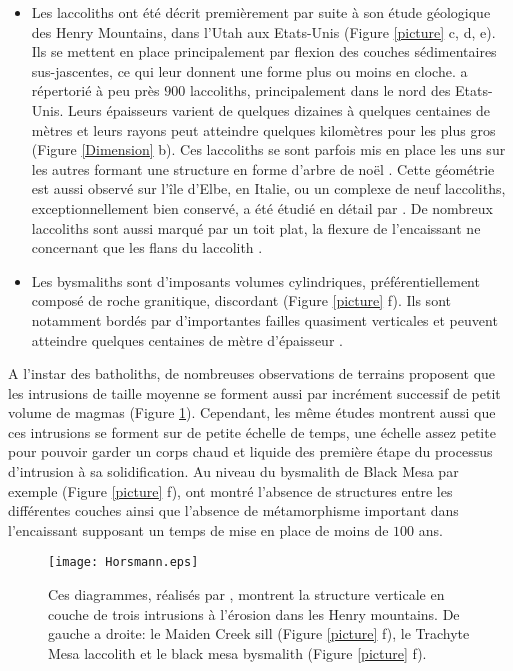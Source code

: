 \begin{itemize}
\item    Les   laccoliths    ont   été    décrit   premièrement    par
  \citet{Gilbert:1877uk}  suite  à  son  étude  géologique  des  Henry
  Mountains, dans  l'Utah aux  Etats-Unis (Figure \ref{picture}  c, d,
  e).  Ils se mettent en  place principalement par flexion des couches
  sédimentaires sus-jascentes, ce  qui leur donnent une  forme plus ou
  moins en  cloche.  \citet{E:2015tl}  a répertorié  à peu  près $900$
  laccoliths,  principalement  dans  le nord  des  Etats-Unis.   Leurs
  épaisseurs  varient de  quelques  dizaines à  quelques centaines  de
  mètres et leurs  rayons peut atteindre quelques  kilomètres pour les
  plus  gros  (Figure  \ref{Dimension}  b).  Ces  laccoliths  se  sont
  parfois mis en place les uns sur les autres formant une structure en
  forme d'arbre  de noël \citep{E:2015tl}.  Cette  géométrie est aussi
  observé  sur  l'île  d'Elbe,  en  Italie, ou  un  complexe  de  neuf
  laccoliths, exceptionnellement bien conservé, a été étudié en détail
  par \citet{Rocchi:2002jy}. De nombreux  laccoliths sont aussi marqué
  par un toit  plat, la flexure de l'encaissant ne  concernant que les
  flans du laccolith \citep{Koch:1981if}.

\item   Les   bysmaliths   sont  d'imposants   volumes   cylindriques,
  préférentiellement composé  de roche granitique,  discordant (Figure
  \ref{picture}  f).   Ils  sont notamment  bordés  par  d'importantes
  failles quasiment verticales et peuvent atteindre quelques centaines
  de mètre d'épaisseur \citep{Johnson:1973ho}.
\end{itemize}

A  l'instar des  batholiths,  de nombreuses  observations de  terrains
proposent que  les intrusions de  taille moyenne se forment  aussi par
incrément     successif     de      petit     volume     de     magmas
\citep{Habert:2004wg,Horsman:2005ct}      (Figure     \ref{Horsmann}).
Cependant,  les  même études  montrent  aussi  que ces  intrusions  se
forment sur de petite échelle de  temps, une échelle assez petite pour
pouvoir  garder  un corps  chaud  et  liquide  des première  étape  du
processus d'intrusion à  sa solidification. Au niveau  du bysmalith de
Black Mesa par exemple (Figure \ref{picture} f), \citet{Habert:2004wg}
ont montré l'absence de structures entre les différentes couches ainsi
que l'absence  de métamorphisme important dans  l'encaissant supposant
un temps de mise en place de moins de $100$ ans.

\begin{figure}
  \begin{center}
    \graphicspath{ {/Users/thorey/Documents/These/Manuscript/Figure/Chapter1/} }
    \texttt{[image: Horsmann.eps]}
    \caption{Ces  diagrammes,  réalisés  par  \citet{Horsman:2009gea},
      montrent la structure verticale en  couche de trois intrusions à
      l'érosion  dans les  Henry  mountains. De  gauche  a droite:  le
      Maiden  Creek sill  (Figure \ref{picture}  f), le  Trachyte Mesa
      laccolith et le black mesa bysmalith (Figure \ref{picture} f).}
    \label{Horsmann}
  \end{center}
\end{figure}

